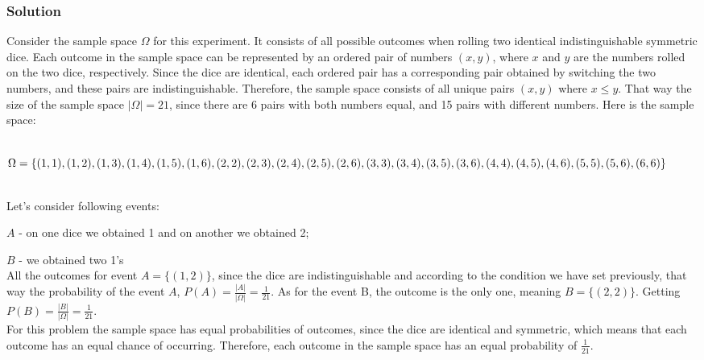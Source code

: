 \documentclass[a4paper]{article}
\begin{document}
\subsubsection*{Solution}

Consider the sample space \(\Omega\) for this experiment. It consists of all possible outcomes when rolling two identical indistinguishable symmetric dice. Each outcome in the sample space can be represented by an ordered pair of numbers \((x,y)\), where \(x\) and \(y\) are the numbers rolled on the two dice, respectively. Since the dice are identical, each ordered pair has a corresponding pair obtained by switching the two numbers, and these pairs are indistinguishable. Therefore, the sample space consists of all unique pairs \((x,y)\) where \(x \leqslant y\).
That way the size of the sample space \(|\Omega| = 21\), since there are 6 pairs with both numbers equal, and 15 pairs with different numbers. Here is the sample space: \\ \\
\begin{center}    
\(\Omega = \{(1,1), (1,2), (1,3), (1,4), (1,5), (1,6), \\ (2,2), (2,3), (2,4), (2,5), (2,6), \\ (3,3), (3,4), (3,5), (3,6), \\ (4,4), (4,5), (4,6), \\ (5,5), (5,6), \\ (6,6)\}\) \\
\end{center}\\Let's consider following events: \\
\par\(A\) - on one dice we obtained 1 and on another we obtained 2; \\
\par\(B\) - we obtained two 1’s \\

All the outcomes for event \(A = \{(1,2)\}\), since the dice are indistinguishable and according to the condition we have set previously, that way the probability of the event \(A\), \(P(A) = \frac{|A|}{|\Omega|} = \frac{1}{21}\). As for the event B, the outcome is the only one, meaning \(B = \{(2,2)\}\). Getting \(P(B) = \frac{|B|}{|\Omega|} = \frac{1}{21}\). \\

For this problem the sample space has equal probabilities of outcomes, since the dice are identical and symmetric, which means that each outcome has an equal chance of occurring. Therefore, each outcome in the sample space has an equal probability of \(\frac{1}{21}\).
\end{document}
